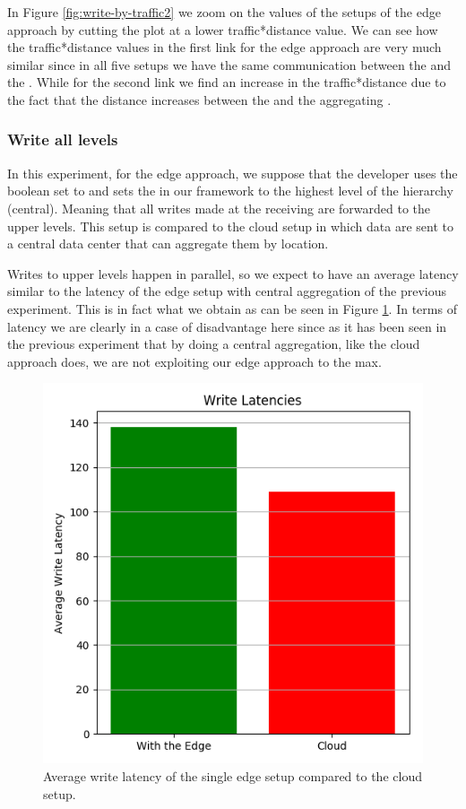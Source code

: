 In Figure \ref{fig:write-by-traffic2} we zoom on the values of the setups of the edge approach by cutting the plot at a lower traffic*distance value. We can see how the traffic*distance values in the first link for the edge approach are very much similar since in all five setups we have the same communication between the  and the . While for the second link we find an increase in the traffic*distance due to the fact that the distance increases between the  and the aggregating .


\subsubsection{Write all levels}
In this experiment, for the edge approach, we suppose that the developer uses the boolean  set to  and sets the  in our framework to the highest level of the hierarchy (central). Meaning that all writes made at the receiving   are forwarded to the upper levels. This setup is compared to the cloud setup in which data are sent to a central data center that can aggregate them by location.

Writes to upper levels happen in parallel, so we expect to have an average latency similar to the latency of the edge setup with central aggregation of the previous experiment. This is in fact what we obtain as can be seen in Figure \ref{fig:write-all-latency}. In terms of latency we are clearly in a case of disadvantage here since as it has been seen in the previous experiment that by doing a central aggregation, like the cloud approach does, we are not exploiting our edge approach to the max.

\begin{figure}[H]
    \centering
    \includegraphics[width=0.75\linewidth]{Figures/Evaluation/write-all-latency.png}
    \caption{Average write latency of the single edge setup compared to the cloud setup.}
    \label{fig:write-all-latency}
\end{figure}

